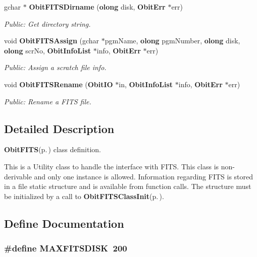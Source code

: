 \begin{CompactItemize}
gchar $\ast$ {\bf Obit\-FITSDirname} ({\bf olong} disk, {\bf Obit\-Err} $\ast$err)
\begin{CompactList}\small\item\em Public: Get directory string. \item\end{CompactList}\item 
void {\bf Obit\-FITSAssign} (gchar $\ast$pgm\-Name, {\bf olong} pgm\-Number, {\bf olong} disk, {\bf olong} scr\-No, {\bf Obit\-Info\-List} $\ast$info, {\bf Obit\-Err} $\ast$err)
\begin{CompactList}\small\item\em Public: Assign a scratch file info. \item\end{CompactList}\item 
void {\bf Obit\-FITSRename} ({\bf Obit\-IO} $\ast$in, {\bf Obit\-Info\-List} $\ast$info, {\bf Obit\-Err} $\ast$err)
\begin{CompactList}\small\item\em Public: Rename a FITS file. \item\end{CompactList}\end{CompactItemize}


\subsection{Detailed Description}
{\bf Obit\-FITS}{\rm (p.\,\pageref{structObitFITS})} class definition. 

This is a Utility class to handle the interface with FITS. This class is non-derivable and only one instance is allowed. Information regarding FITS is stored in a file static structure and is available from function calls. The structure must be initialized by a call to {\bf Obit\-FITSClass\-Init}{\rm (p.\,\pageref{ObitFITS_8c_a2})}.

\subsection{Define Documentation}
\subsubsection{\setlength{\rightskip}{0pt plus 5cm}\#define MAXFITSDISK\ 200}\label{ObitFITS_8h_a0}


